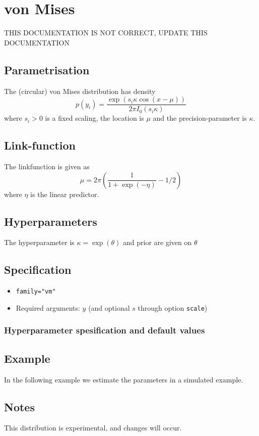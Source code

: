 \documentclass[a4paper,11pt]{article}
\begin{document}
\section*{von Mises}

{\Huge THIS DOCUMENTATION IS NOT CORRECT, UPDATE THIS DOCUMENTATION}

\subsection*{Parametrisation}

The (circular) von Mises distribution has density
\begin{displaymath}
    p(y_i) =\frac{\exp(s_i\kappa \cos(x-\mu ))}{2\pi I_{0}(s_i\kappa)}
\end{displaymath}
where $s_i>0$ is a fixed scaling, the location is $\mu$
and the precision-parameter is $\kappa$.

\subsection*{Link-function}

The linkfunction is given as 
\begin{displaymath}
    \mu =  2\pi \left(\frac{1}{1+\exp(-\eta)} - 1/2\right)
\end{displaymath}
where $\eta$  is the linear predictor.

\subsection*{Hyperparameters}

The hyperparameter is ${\kappa}=\exp(\theta)$
and prior are given on $\theta$
\subsection*{Specification}

\begin{itemize}
\item \texttt{family="vm"}
\item Required arguments: $y$ (and optional $s$ through option
    \texttt{scale})
\end{itemize}

\subsubsection*{Hyperparameter spesification and default values}


\subsection*{Example}

In the following example we estimate the parameters in a simulated
example.


\subsection*{Notes}

This distribution is experimental, and changes will occur.
\end{document}
